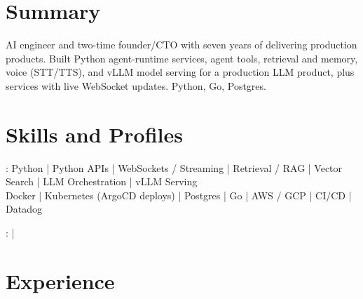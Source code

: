 \documentclass[print]{jack-resume}
\begin{document}
\pagecolor{darkmodeBackground}


\begin{minipage}[t][1cm][t]{.03\textwidth}
    \hfill
\end{minipage}

\section{Summary}
AI engineer and two-time founder/CTO with seven years of delivering production products. Built Python agent-runtime services, agent tools, retrieval and memory, voice (STT/TTS), and vLLM model serving for a production LLM product, plus services with live WebSocket updates. Python, Go, Postgres.
\sectionsep

\section{Skills and Profiles}
:
Python \hfill | \hfill
Python APIs \hfill | \hfill
WebSockets / Streaming \hfill | \hfill
Retrieval / RAG \hfill | \hfill
Vector Search \hfill | \hfill
LLM Orchestration \hfill | \hfill
vLLM Serving \\
\hspace{1.0cm} Docker \hfill | \hfill
Kubernetes (ArgoCD deploys) \hfill | \hfill
Postgres \hfill | \hfill
Go \hfill | \hfill
AWS / GCP \hfill | \hfill
CI/CD \hfill | \hfill
Datadog \\

\raggedright{
    :
      \href{https://www.linkedin.com/in/jack-sturtevant/}{ \ExternalLink} |
     \href{https://github.com/jacksturt}{ \ExternalLink}}

\section{Experience}
\end{document}
